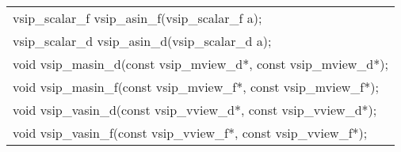 \\\cvsiplh
\afh
\\\hspace*{.04\textwidth} {
\ttfamily
\begin{tabular}[H]{l}
vsip\_scalar\_f vsip\_asin\_f(vsip\_scalar\_f a);\\
vsip\_scalar\_d vsip\_asin\_d(vsip\_scalar\_d a);\\
void vsip\_masin\_d(const vsip\_mview\_d*, const vsip\_mview\_d*);\\
void vsip\_masin\_f(const vsip\_mview\_f*, const vsip\_mview\_f*);\\
void vsip\_vasin\_d(const vsip\_vview\_d*, const vsip\_vview\_d*);\\
void vsip\_vasin\_f(const vsip\_vview\_f*, const vsip\_vview\_f*);\\
\end{tabular}
}
\\\pyjvsiph
{}
